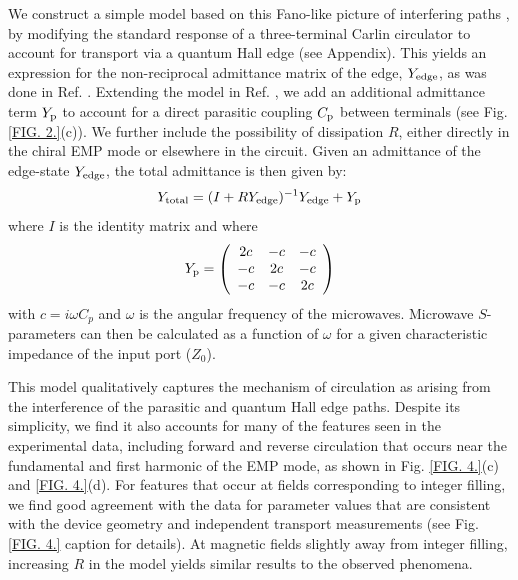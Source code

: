 We construct a simple model based on this Fano-like picture of interfering paths \cite{miroshnichenko2010fano}, by modifying the standard response of a three-terminal Carlin circulator to account for transport via a quantum Hall edge (see Appendix). This yields an expression for the non-reciprocal admittance matrix of the edge, $Y_{\rm edge}$, as was done in Ref. \cite{viola2014hall}. Extending the model in Ref. \cite{viola2014hall}, we add an additional admittance term $Y_{\rm p}$ to account for a direct parasitic coupling $C_{\rm p}$ between terminals (see Fig. \ref{FIG. 2.}(c)). We further include the possibility of dissipation $R$, either directly in the chiral EMP mode or elsewhere in the circuit. Given an admittance of the edge-state $Y_{\rm edge}$, the total admittance is then given by: 
\begin{equation}
	{Y_{{\rm{total}}}} = {({I} + R  Y_{\rm edge})^{ - 1}}Y_{\rm edge} + {Y_{{\rm{p}}}}
\end{equation}
where $I$ is the identity matrix and where 
\[ {Y_{{\rm{p}}}} = \left( {\begin{array}{*{20}{c}}
{2c}&{ - c}&{ - c}\\
{ - c}&{2c}&{ - c}\\
{ - c}&{ - c}&{2c}
\end{array}} \right)\]
with $c = i\omega {C_p}$ and $\omega$ is the angular frequency of the microwaves. Microwave $S$-parameters can then be calculated as a function of $\omega$ for a given characteristic impedance of the input port ($Z_0$).

This model qualitatively captures the mechanism of circulation as arising from the interference of the parasitic and quantum Hall edge paths. Despite its simplicity, we find it also accounts for many of the features seen in the experimental data, including forward and reverse circulation that occurs near the fundamental and first harmonic of the EMP mode, as shown in Fig. \ref{FIG. 4.}(c) and \ref{FIG. 4.}(d). For features that occur at fields corresponding to integer filling, we find good agreement with the data for parameter values that are consistent with the device geometry and independent transport measurements (see Fig. \ref{FIG. 4.} caption for details). At magnetic fields slightly away from integer filling, increasing $R$ in the model yields similar results to the observed phenomena.

